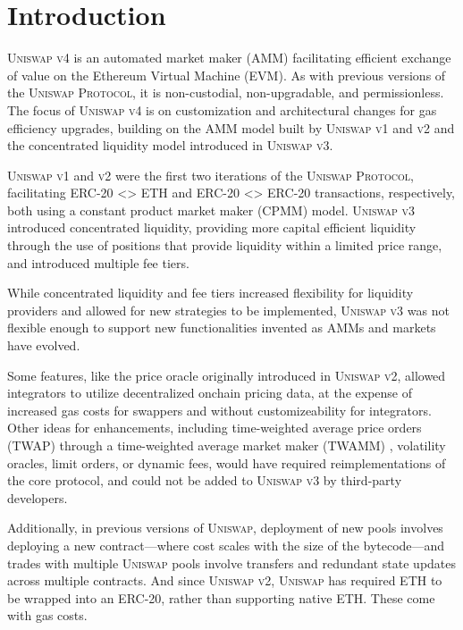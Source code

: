 \documentclass[sigconf,nonacm,prologue,table]{acmart}
\numberwithin{equation}{section}
\theoremstyle{definition}
\theoremstyle{remark}
\begin{document}
\section{Introduction} \label{sec:introduction}
\textsc{Uniswap v4} is an automated market maker (AMM) facilitating efficient exchange of value on the Ethereum Virtual Machine (EVM). As with previous versions of the \textsc{Uniswap Protocol}, it is non-custodial, non-upgradable, and permissionless. The focus of \textsc{Uniswap v4} is on customization and architectural changes for gas efficiency upgrades, building on the AMM model built by \textsc{Uniswap v1} and \textsc{v2} and the concentrated liquidity model introduced in \textsc{Uniswap v3}.

\textsc{Uniswap v1} \cite{Adams18} and \textsc{v2} \cite{Adams20} were the first two iterations of the \textsc{Uniswap Protocol}, facilitating ERC-20 <> ETH and ERC-20 <> ERC-20 transactions, respectively, both using a constant product market maker (CPMM) model. \textsc{Uniswap v3} \cite{Adams21} introduced concentrated liquidity, providing more capital efficient liquidity through the use of positions that provide liquidity within a limited price range, and introduced multiple fee tiers.

While concentrated liquidity and fee tiers increased flexibility for liquidity providers and allowed for new strategies to be implemented, \textsc{Uniswap v3} was not flexible enough to support new functionalities invented as AMMs and markets have evolved.

Some features, like the price oracle originally introduced in \textsc{Uniswap v2}, allowed integrators to utilize decentralized onchain pricing data, at the expense of increased gas costs for swappers and without customizeability for integrators. Other ideas for enhancements, including time-weighted average price orders (TWAP) through a time-weighted average market maker (TWAMM) \cite{White2021}, volatility oracles, limit orders, or dynamic fees, would have required reimplementations of the core protocol, and could not be added to \textsc{Uniswap v3} by third-party developers.

Additionally, in previous versions of \textsc{Uniswap}, deployment of new pools involves deploying a new contract—where cost scales with the size of the bytecode—and trades with multiple \textsc{Uniswap} pools involve transfers and redundant state updates across multiple contracts. And since \textsc{Uniswap v2}, \textsc{Uniswap} has required ETH to be wrapped into an ERC-20, rather than supporting native ETH. These come with gas costs.
\end{document}
